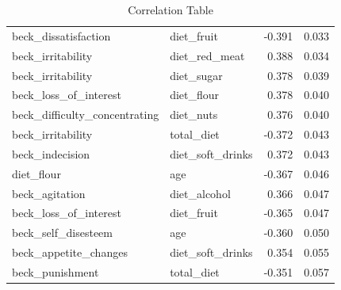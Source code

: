\documentclass[jou]{apa7}
\begin{document}
\begin{table}[!ht]
{\begin{tabular}{@{}llrr@{}}
			beck\_dissatisfaction           & diet\_fruit           & -0.391                                   & 0.033                                 \\
			beck\_irritability              & diet\_red\_meat       & 0.388                                    & 0.034                                 \\
			beck\_irritability              & diet\_sugar           & 0.378                                    & 0.039                                 \\
			beck\_loss\_of\_interest        & diet\_flour           & 0.378                                    & 0.040                                 \\
			beck\_difficulty\_concentrating & diet\_nuts            & 0.376                                    & 0.040                                 \\
			beck\_irritability              & total\_diet           & -0.372                                   & 0.043                                 \\
			beck\_indecision                & diet\_soft\_drinks    & 0.372                                    & 0.043                                 \\
			diet\_flour                     & age                   & -0.367                                   & 0.046                                 \\
			beck\_agitation                 & diet\_alcohol         & 0.366                                    & 0.047                                 \\
			beck\_loss\_of\_interest        & diet\_fruit           & -0.365                                   & 0.047                                 \\
			beck\_self\_disesteem           & age                   & -0.360                                   & 0.050                                 \\
			beck\_appetite\_changes         & diet\_soft\_drinks    & 0.354                                    & 0.055                                 \\
			beck\_punishment                & total\_diet           & -0.351                                   & 0.057                                 \\ \bottomrule
		\end{tabular}%
	}
	\caption{Correlation Table}
	\label{tab:tableOfCorr}
\end{table}
\end{document}
